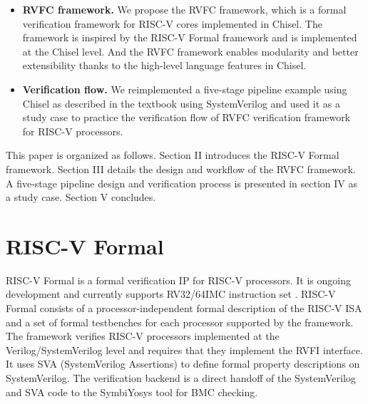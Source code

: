 \documentclass[conference]{IEEEtran}
\theoremstyle{definition}
\begin{document}
\begin{itemize}
    \item \textbf{RVFC framework.} 
    We propose the RVFC framework, which is a formal verification framework for RISC-V cores implemented in Chisel. The framework is inspired by the RISC-V Formal framework and is implemented at the Chisel level.
    And the RVFC framework enables modularity and better extensibility thanks to the high-level language features in Chisel.
    \item \textbf{Verification flow.}
    We reimplemented a five-stage pipeline example using Chisel as described in the textbook \cite{patterson2017computer} using SystemVerilog and used it as a study case to practice the verification flow of RVFC verification framework for RISC-V processors.
\end{itemize}

This paper is organized as follows. Section II introduces the RISC-V Formal framework. Section III details the design and workflow of the RVFC framework. 
A five-stage pipeline design and verification process is presented in section IV as a study case.
Section V concludes.

\section{RISC-V Formal}

RISC-V Formal is a formal verification IP for RISC-V processors.
It is ongoing development and currently supports RV32/64IMC instruction set \cite{riscvf}.
RISC-V Formal consists of a processor-independent formal description of the RISC-V ISA and a set of formal testbenches for each processor supported by the framework.
The framework verifies RISC-V processors implemented at the Verilog/SystemVerilog level and requires that they implement the RVFI interface.
It uses SVA (SystemVerilog Assertions) \cite{vijayaraghavan2005practical} to define formal property descriptions on SystemVerilog.
The verification backend is a direct handoff of the SystemVerilog and SVA code to the SymbiYosys \cite{SymbiYosys} tool for BMC checking.
\end{document}
